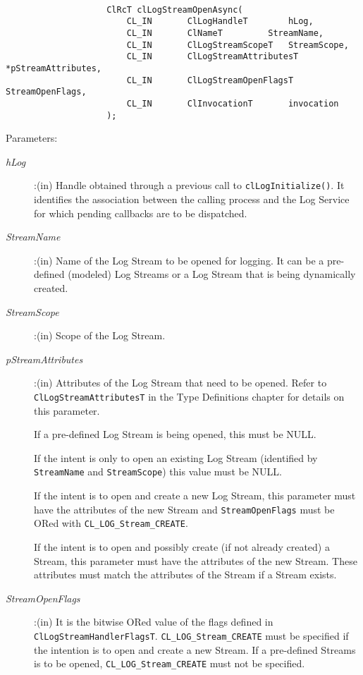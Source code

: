 \begin{flushleft}
\begin{Desc}
\begin{verbatim}
					
					ClRcT clLogStreamOpenAsync(
						CL_IN		ClLogHandleT		hLog,
						CL_IN		ClNameT			StreamName,
						CL_IN 		ClLogStreamScopeT	StreamScope,
						CL_IN		ClLogStreamAttributesT	*pStreamAttributes,
						CL_IN		ClLogStreamOpenFlagsT	StreamOpenFlags,
						CL_IN		ClInvocationT		invocation
					);

\end{verbatim}
\normalsize
\end{Desc}


\begin{Desc}
\item[Parameters:] 
\begin{description}
\item[{\em hLog}]:(in) Handle obtained through a previous call to {\tt{clLogInitialize()}}. It identifies the association between the calling process and 
the Log Service for which pending callbacks are to be dispatched.
\item[{\em StreamName}]:(in) Name of the Log Stream to be opened for logging. It can be a pre-defined (modeled) Log Streams or a Log Stream that is being 
dynamically created.
\item[{\em StreamScope}]:(in) Scope of the Log Stream.
\item[{\em pStreamAttributes}]:(in) Attributes of the Log Stream that need to be opened. Refer to {\tt{ClLogStreamAttributesT}} in the Type Definitions 
chapter for details on this parameter. 
\par 
If a pre-defined Log Stream is being opened, this must be NULL. 
\par
If the intent is only to open an existing Log Stream (identified by {\tt{StreamName}} and {\tt{StreamScope}}) this value must be NULL. 
\par
If the intent is to open and create a new Log Stream, this parameter must have the attributes of the new Stream and {\tt{StreamOpenFlags}} must
be ORed with {\tt{CL\_\-LOG\_\-Stream\_\-CREATE}}. 
\par
If the intent is to open and possibly create (if not already created) a Stream, this parameter must have 
the attributes of the new Stream. These attributes must match the attributes of the Stream if a Stream exists.


\item[{\em StreamOpenFlags}]:(in) It is the bitwise ORed value of the flags defined in {\tt{ClLogStreamHandlerFlagsT}}. 
{\tt{CL\_\-LOG\_\-Stream\_\-CREATE}} must be specified if the intention is to open and create a new Stream. If a pre-defined Streams is to be opened, 
{\tt{CL\_\-LOG\_\-Stream\_\-CREATE}} must not be specified.


\end{description}
\end{Desc}
\end{flushleft}
